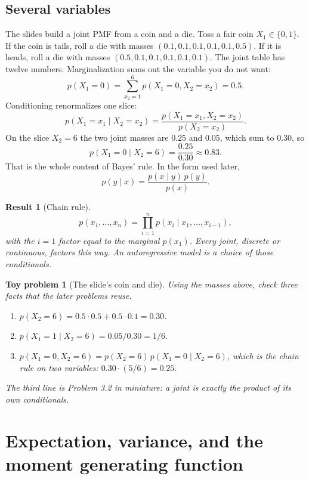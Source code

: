 \documentclass[11pt]{article}
\newtheorem{result}{Result}
\newtheorem{toy}{Toy problem}
\theoremstyle{remark}
\begin{document}
\subsection{Several variables}

The slides build a joint PMF from a coin and a die. Toss a fair coin \(X_1\in\{0,1\}\). If the coin is tails, roll a die with masses \((0.1,0.1,0.1,0.1,0.1,0.5)\). If it is heads, roll a die with masses \((0.5,0.1,0.1,0.1,0.1,0.1)\). The joint table has twelve numbers. Marginalization sums out the variable you do not want:
\[
p(X_1=0)=\sum_{x_2=1}^{6}p(X_1=0,X_2=x_2)=0.5.
\]
Conditioning renormalizes one slice:
\[
p(X_1=x_1\mid X_2=x_2)=\frac{p(X_1=x_1,X_2=x_2)}{p(X_2=x_2)}.
\]
On the slice \(X_2=6\) the two joint masses are \(0.25\) and \(0.05\), which sum to \(0.30\), so
\[
p(X_1=0\mid X_2=6)=\frac{0.25}{0.30}\approx 0.83.
\]
That is the whole content of Bayes' rule. In the form used later,
\[
p(y\mid x)=\frac{p(x\mid y)\,p(y)}{p(x)}.
\]

\begin{result}[Chain rule]
\[
p(x_1,\ldots,x_n)=\prod_{i=1}^n p(x_i\mid x_1,\ldots,x_{i-1}),
\]
with the \(i=1\) factor equal to the marginal \(p(x_1)\). Every joint, discrete or continuous, factors this way. An autoregressive model is a choice of those conditionals.
\end{result}

\begin{toy}[The slide's coin and die]
Using the masses above, check three facts that the later problems reuse.
\begin{enumerate}
\item \(p(X_2=6)=0.5\cdot 0.5+0.5\cdot 0.1=0.30\).
\item \(p(X_1=1\mid X_2=6)=0.05/0.30=1/6\).
\item \(p(X_1=0,X_2=6)=p(X_2=6)\,p(X_1=0\mid X_2=6)\), which is the chain rule on two variables: \(0.30\cdot(5/6)=0.25\).
\end{enumerate}
The third line is Problem 3.2 in miniature: a joint is exactly the product of its own conditionals.
\end{toy}

\section{Expectation, variance, and the moment generating function}
\label{sec:moments}
\end{document}
